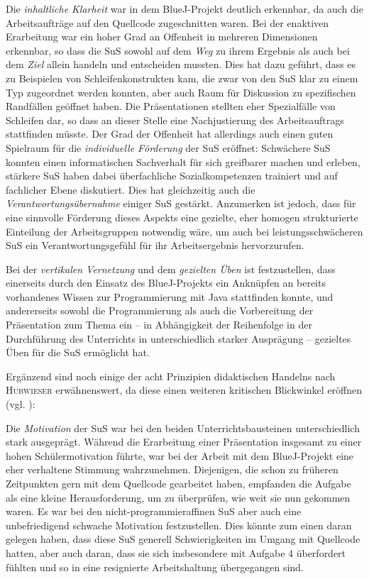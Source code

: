 \documentclass[paper=a4, DIV=13, BCOR=8mm, oneside=on, onecolumn=on, open = any, titlepage =on, parskip =half-, headsepline = on, footsepline = off, chapterprefix = on, sectionprefix = on, appendixprefix = off, fontsize = 12pt, numbers = noenddot, abstract = off]{scrreprt}
\begin{document}
Die \emph{inhaltliche Klarheit} war in dem BlueJ-Projekt deutlich erkennbar, da auch die Arbeitsaufträge auf den Quellcode zugeschnitten waren. Bei der enaktiven Erarbeitung war ein hoher Grad an Offenheit in mehreren Dimensionen erkennbar, so dass die SuS sowohl auf dem \emph{Weg} zu ihrem Ergebnis als auch bei dem \emph{Ziel} allein handeln und entscheiden mussten. Dies hat dazu geführt, dass es zu Beispielen von Schleifenkonstrukten kam, die zwar von den SuS klar zu einem Typ zugeordnet werden konnten, aber auch Raum für Diskussion zu spezifischen Randfällen geöffnet haben. Die Präsentationen stellten eher Spezialfälle von Schleifen dar, so dass an dieser Stelle eine Nachjustierung des Arbeitsauftrags stattfinden müsste. Der Grad der Offenheit hat allerdings auch einen guten Spielraum für die \emph{individuelle Förderung} der SuS eröffnet: Schwächere SuS konnten einen informatischen Sachverhalt für sich greifbarer machen und erleben, stärkere SuS haben dabei überfachliche Sozialkompetenzen trainiert und auf fachlicher Ebene diskutiert. Dies hat gleichzeitig auch die \emph{Verantwortungsübernahme} einiger SuS gestärkt. Anzumerken ist jedoch, dass für eine sinnvolle Förderung dieses Aspekts eine gezielte, eher homogen strukturierte Einteilung der Arbeitsgruppen notwendig wäre, um auch bei leistungsschwächeren SuS ein Verantwortungsgefühl für ihr Arbeitsergebnis hervorzurufen.

Bei der \emph{vertikalen Vernetzung} und dem \emph{gezielten Üben} ist festzustellen, dass einerseits durch den Einsatz des BlueJ-Projekts ein Anknüpfen an bereits vorhandenes Wissen zur Programmierung mit Java stattfinden konnte, und andererseits sowohl die Programmierung als auch die Vorbereitung der Präsentation zum Thema ein -- in Abhängigkeit der Reihenfolge in der Durchführung des Unterrichts in unterschiedlich starker Ausprägung -- gezieltes Üben für die SuS ermöglicht hat.

Ergänzend sind noch einige der acht Prinzipien didaktischen Handelns nach \textsc{Hubwieser} erwähnenswert, da diese einen weiteren kritischen Blickwinkel eröffnen (vgl. \cite[S.15ff.]{hubwieser:07}):

Die \emph{Motivation} der SuS war bei den beiden Unterrichtsbausteinen unterschiedlich stark ausgeprägt. Während die Erarbeitung einer Präsentation insgesamt zu einer hohen Schülermotivation führte, war bei der Arbeit mit dem BlueJ-Projekt eine eher verhaltene Stimmung wahrzunehmen. Diejenigen, die schon zu früheren Zeitpunkten gern mit dem Quellcode gearbeitet haben, empfanden die Aufgabe als eine kleine Herausforderung, um zu überprüfen, wie weit sie nun gekommen waren. Es war bei den nicht-programmieraffinen SuS aber auch eine unbefriedigend schwache Motivation festzustellen. Dies könnte zum einen daran gelegen haben, dass diese SuS generell Schwierigkeiten im Umgang mit Quellcode hatten, aber auch daran, dass sie sich insbesondere mit Aufgabe 4 überfordert fühlten und so in eine resignierte Arbeitshaltung übergegangen sind. 
\end{document}
